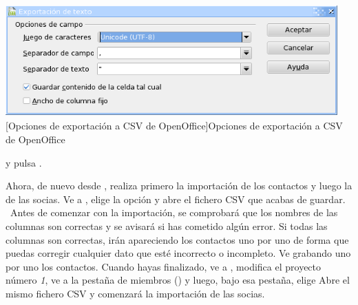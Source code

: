 \begin{center}
\includegraphics[width=12.748cm,height=4.309cm]{manual-img19.png}
[Opciones de exportación a CSV de
OpenOffice]{Opciones de exportación a CSV de OpenOffice}

\end{center}
y pulsa .

Ahora, de nuevo desde \appname, realiza primero la importación de los
contactos y luego la de las socias. Ve a
, elige la
opción  y abre el
fichero CSV que acabas de guardar. \ Antes de comenzar con la
importación, se comprobará que los nombres de las columnas son
correctas y se avisará si has cometido algún error. Si todas las
columnas son correctas, irán apareciendo los contactos uno por uno de
forma que puedas corregir cualquier dato que esté incorrecto o
incompleto. Ve grabando uno por uno los contactos. Cuando hayas
finalizado, ve a , modifica el proyecto número \textit{1}, ve a la
pestaña de miembros () y luego, bajo esa
pestaña, elige 
Abre el mismo fichero CSV y comenzará la importación de las socias.



